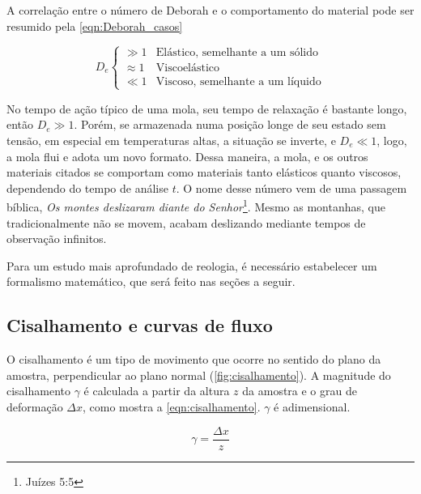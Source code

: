 		A correlação entre o número de Deborah e o comportamento do material pode ser resumido pela \autoref{eqn:Deborah_casos}\cite{Goodwin2008}
		
		\begin{equation}
			D_e
			\begin{cases}
				\gg 1     & \textrm{Elástico, semelhante a um sólido}      \\
				\approx 1 & \textrm{Viscoelástico} \\
				\ll 1     & \textrm{Viscoso, semelhante a um líquido}
			\end{cases}
			\label{eqn:Deborah_casos}
		\end{equation} 
		
		No tempo de ação típico de uma mola, seu tempo de relaxação é bastante longo, então \(D_e \gg 1\). Porém, se armazenada numa posição longe de seu estado sem tensão, em especial em temperaturas altas, a situação se inverte, e \(D_e \ll 1\), logo, a mola flui e adota um novo formato. Dessa maneira, a mola, e os outros materiais citados se comportam como materiais tanto elásticos quanto viscosos, dependendo do tempo de análise \(t\). O nome desse número vem de uma passagem bíblica, \emph{Os montes deslizaram diante do Senhor}\footnote{Juízes 5:5}. Mesmo as montanhas, que tradicionalmente não se movem, acabam deslizando mediante tempos de observação infinitos.
		
		Para um estudo mais aprofundado de reologia, é necessário estabelecer um formalismo matemático, que será feito nas seções a seguir.
		
			\subsection{Cisalhamento e curvas de fluxo} 
			
			O cisalhamento é um tipo de movimento que ocorre no sentido do plano da amostra, perpendicular ao plano normal (\autoref{fig:cisalhamento}). A magnitude do cisalhamento \(\gamma\) é calculada a partir da altura \(z\) da amostra e o grau de deformação \(\Delta x\), como mostra a \autoref{eqn:cisalhamento}\cite{Goodwin2008}. \(\gamma\) é adimensional.
			
			\begin{equation}  
				\gamma = \frac{\Delta x}{z}
				\label{eqn:cisalhamento}
			\end{equation} 
			
